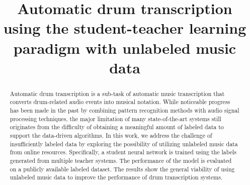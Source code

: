 \documentclass{article}
\title{Automatic drum transcription using the student-teacher learning paradigm with unlabeled music data}
\begin{document}
%
\maketitle
%
\begin{abstract}
Automatic drum transcription is a sub-task of automatic music transcription that converts drum-related audio events into musical notation. While noticeable progress has been made in the past by combining pattern recognition methods with audio signal processing techniques, the major limitation of many state-of-the-art systems still originates from the difficulty of obtaining a meaningful amount of labeled data to support the data-driven algorithms. In this work, we address the challenge of insufficiently labeled data by exploring the possibility of utilizing unlabeled music data from online resources. Specifically, a student neural network is trained using the labels generated from multiple teacher systems. The performance of the model is evaluated on a publicly available labeled dataset. The results show the general viability of using unlabeled music data to improve the performance of drum transcription systems. 
\end{abstract}
%
\end{document}
